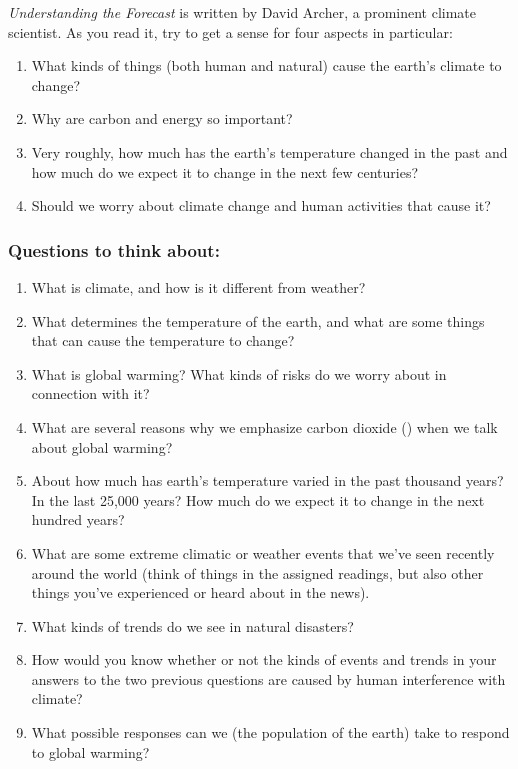 \documentclass[
]{article}
\providecommand{\tightlist}{%
  \setlength{\itemsep}{0pt}\setlength{\parskip}{0pt}}
\newcommand{\COO}{\ce{CO2}}
\begin{document}
\emph{Understanding the Forecast} is written by David Archer, a
prominent climate scientist. As you read it, try to get a sense for four
aspects in particular:

\begin{enumerate}
\def\labelenumi{\arabic{enumi}.}
\tightlist
\item
  What kinds of things (both human and natural) cause the earth's
  climate to change?
\item
  Why are carbon and energy so important?
\item
  Very roughly, how much has the earth's temperature changed in the past
  and how much do we expect it to change in the next few centuries?
\item
  Should we worry about climate change and human activities that cause
  it?
\end{enumerate}

\hypertarget{questions-to-think-about}{%
\subsubsection{Questions to think
about:}\label{questions-to-think-about}}

\begin{enumerate}
\def\labelenumi{\arabic{enumi}.}
\tightlist
\item
  What is climate, and how is it different from weather?
\item
  What determines the temperature of the earth, and what are some things
  that can cause the temperature to change?
\item
  What is global warming? What kinds of risks do we worry about in
  connection with it?
\item
  What are several reasons why we emphasize carbon dioxide (\COO{}) when
  we talk about global warming?
\item
  About how much has earth's temperature varied in the past thousand
  years? In the last 25,000 years? How much do we expect it to change in
  the next hundred years?
\item
  What are some extreme climatic or weather events that we've seen
  recently around the world (think of things in the assigned readings,
  but also other things you've experienced or heard about in the news).
\item
  What kinds of trends do we see in natural disasters?
\item
  How would you know whether or not the kinds of events and trends in
  your answers to the two previous questions are caused by human
  interference with climate?
\item
  What possible responses can we (the population of the earth) take to
  respond to global warming?
\end{enumerate}
\end{document}
